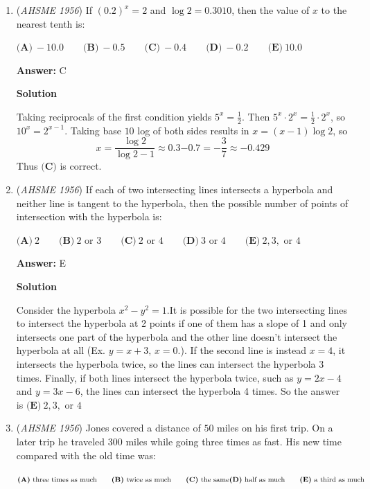 \begin{enumerate}
 


	\item (\textit{AHSME 1956}) If $(0.2)^x = 2$ and $\log 2 = 0.3010$, then the value of $x$ to the nearest tenth is: 


 $\textbf{(A)}\ - 10.0 \qquad\textbf{(B)}\ - 0.5 \qquad\textbf{(C)}\ - 0.4 \qquad\textbf{(D)}\ - 0.2 \qquad\textbf{(E)}\ 10.0$

 \textbf{Answer: }C



\textbf{Solution}

Taking reciprocals of the first condition yields $5^x=\frac{1}{2}$. Then $5^x\cdot2^x=\frac{1}{2}\cdot2^x$, so $10^x=2^{x-1}$. Taking base $10$ log of both sides results in $x=(x-1)\log 2$, so
 \[x=\frac{\log2}{\log2-1}\approx{0.3}{-0.7}=-\frac{3}{7}\approx-0.429\]Thus $\boxed{\textbf{(C)}}$ is correct.

 


	\item (\textit{AHSME 1956}) If each of two intersecting lines intersects a hyperbola and neither line is tangent to the hyperbola, 
then the possible number of points of intersection with the hyperbola is: 


 $\textbf{(A)}\ 2\qquad \textbf{(B)}\ 2\text{ or }3\qquad \textbf{(C)}\ 2\text{ or }4\qquad \textbf{(D)}\ 3\text{ or }4\qquad \textbf{(E)}\ 2,3,\text{ or }4$

 \textbf{Answer: }E



\textbf{Solution}

Consider the hyperbola $x^2-y^2=1$.It is possible for the two intersecting lines to intersect the hyperbola at 2 points if one of them has a slope of 1 and only intersects one part of the hyperbola and the other line doesn't intersect the hyperbola at all (Ex. $y=x+3,\, x=0.$). If the second line is instead $x=4$, it intersects the hyperbola twice, so the lines can intersect the hyperbola 3 times. Finally, if both lines intersect the hyperbola twice, such as $y=2x-4$ and $y=3x-6$, the lines can intersect the hyperbola 4 times. So the answer is $\textbf{(E)}\ 2,3,\text{ or } 4$



	\item (\textit{AHSME 1956}) Jones covered a distance of $50$ miles on his first trip. On a later trip he traveled $300$ miles while going three times as fast. 
His new time compared with the old time was: 


 $\textbf{(A)}\ \text{three times as much} \qquad \textbf{(B)}\ \text{twice as much} \qquad \textbf{(C)}\ \text{the same} \\ \textbf{(D)}\ \text{half as much} \qquad \textbf{(E)}\ \text{a third as much}$


\end{enumerate}
